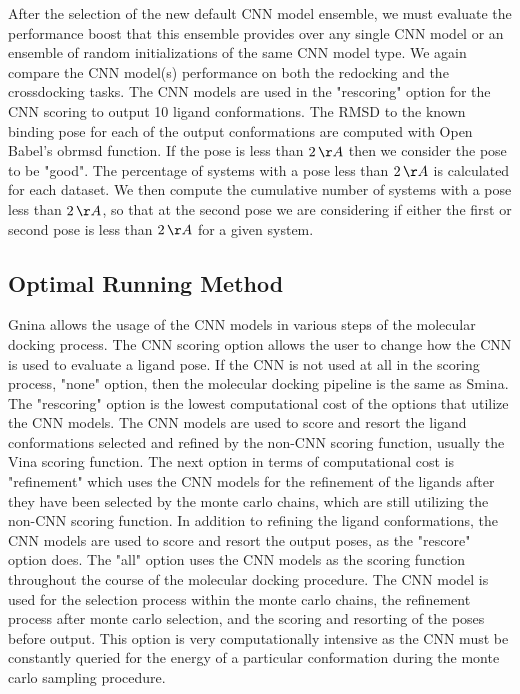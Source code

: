 \documentclass[journal=jcisd8,manuscript=article]{achemso}
\begin{document}
After the selection of the new default CNN model ensemble, we must evaluate the performance boost that this ensemble provides over any single CNN model or an ensemble of random initializations of the same CNN model type. We again compare the CNN model(s) performance on both the redocking and the crossdocking tasks. The CNN models are used in the "rescoring" option for the CNN scoring to output 10 ligand conformations. The RMSD to the known binding pose for each of the output conformations are computed with Open Babel's obrmsd function. If the pose is less than $2\,\AA$ then we consider the pose to be "good". The percentage of systems with a pose less than $2\,\AA$ is calculated for each dataset. We then compute the cumulative number of systems with a pose less than $2\,\AA$, so that at the second pose we are considering if either the first or second pose is less than $2\,\AA$ for a given system.

\subsection{Optimal Running Method}
Gnina allows the usage of the CNN models in various steps of the molecular docking process. The CNN scoring option allows the user to change how the CNN is used to evaluate a ligand pose. If the CNN is not used at all in the scoring process, "none" option, then the molecular docking pipeline is the same as Smina. The "rescoring" option is the lowest computational cost of the options that utilize the CNN models. The CNN models are used to score and resort the ligand conformations selected and refined by the non-CNN scoring function, usually the Vina scoring function. The next option in terms of computational cost is "refinement" which uses the CNN models for the refinement of the ligands after they have been selected by the monte carlo chains, which are still utilizing the non-CNN scoring function. In addition to refining the ligand conformations, the CNN models are used to score and resort the output poses, as the "rescore" option does. The "all" option uses the CNN models as the scoring function throughout the course of the molecular docking procedure. The CNN model is used for the selection process within the monte carlo chains, the refinement process after monte carlo selection, and the scoring and resorting of the poses before output. This option is very computationally intensive as the CNN must be constantly queried for the energy of a particular conformation during the monte carlo sampling procedure.
\end{document}
